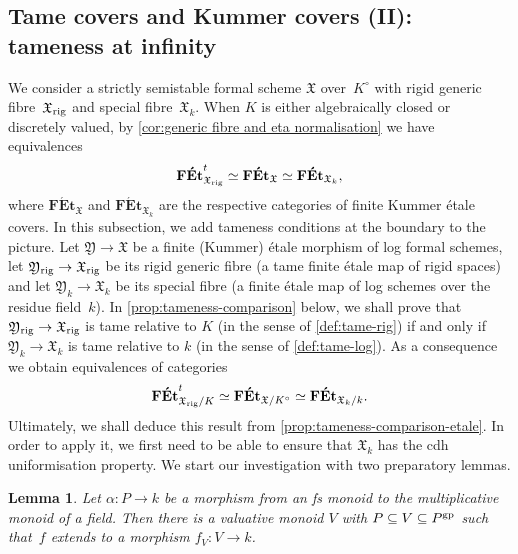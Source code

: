 \documentclass[a4paper,twoside,11pt,reqno]{amsart}
\newcommand{\fX}{{\mathfrak{X}}}
\newcommand{\fY}{{\mathfrak{Y}}}
\newcommand{\gp}{{\rm gp}}
\newcommand{\cat}[1]{\mathbf{#1}}
\newcommand{\FEt}{\cat{F\acute{E}t}}
\newcommand{\rig}{{\rm rig}}
\newtheorem{lem}[thm]{Lemma}
\theoremstyle{definition}
\numberwithin{equation}{subsection}
\begin{document}
\subsection{Tame covers and Kummer covers (II): tameness at infinity}
\label{ss:tameness-comparison}

We consider a  strictly semistable formal scheme $\fX$ over~$K^\circ$ with rigid generic fibre~$\fX_\rig$ and special fibre~$\fX_k$.
When  $K$ is either algebraically closed or discretely valued, by \cref{cor:generic fibre and eta normalisation} 
we have equivalences
\[
 \FEt^t_{\fX_\rig} \simeq \FEt_\fX \simeq \FEt_{\fX_k},
\]
where $\FEt_\fX$ and $\FEt_{\fX_k}$ are the respective categories of finite Kummer \'etale covers.
In this subsection, we add tameness conditions at the boundary to the picture.
Let $\fY \to \fX$ be a finite (Kummer) étale morphism of log formal schemes, let $\fY_\rig \to \fX_\rig$ be its rigid generic fibre (a tame finite étale map of rigid spaces) and let $\fY_k \to \fX_k$ be its special fibre (a finite \'etale map of log schemes over the residue field~$k$). In \cref{prop:tameness-comparison} below, we shall prove that $\fY_\rig \to \fX_\rig$ is tame relative to $K$ (in the sense of \cref{def:tame-rig}) if and only if $\fY_k\to \fX_k$ is tame relative to $k$ (in the sense of \cref{def:tame-log}).
As a consequence we obtain equivalences of categories
\[
 \FEt^t_{\fX_\rig/K} \simeq \FEt_{\fX/K^\circ} \simeq \FEt_{\fX_k/k}.
\]
Ultimately, we shall deduce this result from \cref{prop:tameness-comparison-etale}. In order to apply it, we first need to be able to ensure that $\fX_k$ has the cdh uniformisation property.
We start our investigation with two preparatory lemmas.

\begin{lem} \label{lem:extend-valuative}
    Let $\alpha \colon P \to k$ be a morphism from an fs monoid to the multiplicative monoid of a field.
    Then there is a valuative monoid $V$ with $P \subseteq V \subseteq P^\gp$ such that~$f$ extends to a morphism $f_V \colon V \to k$.
\end{lem}
\end{document}
